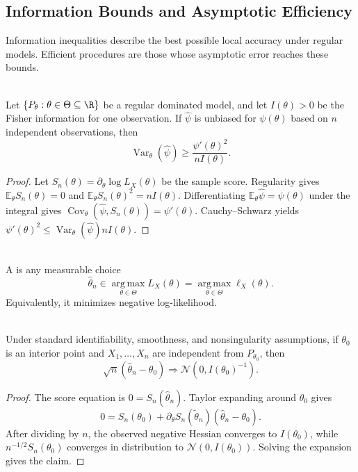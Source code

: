 \subsection{Information Bounds and Asymptotic Efficiency}

Information inequalities describe the best possible local accuracy under regular models.  Efficient procedures are those whose asymptotic error reaches these bounds.

\begin{theorem} \label{thm:cramer-rao-bound} \\
Let $\{P_\theta:\theta\in\Theta\subseteq\R\}$ be a regular dominated model, and let $I(\theta)>0$ be the Fisher information for one observation.  If $\widehat{\psi}$ is unbiased for $\psi(\theta)$ based on $n$ independent observations, then
\[
\operatorname{Var}_\theta(\widehat{\psi})
\geq \frac{\psi'(\theta)^2}{nI(\theta)}.
\]
\begin{proof}
Let $S_n(\theta)=\partial_\theta\log L_X(\theta)$ be the sample score.  Regularity gives $\mathbb{E}_\theta S_n(\theta)=0$ and $\mathbb{E}_\theta S_n(\theta)^2=nI(\theta)$.  Differentiating $\mathbb{E}_\theta\widehat{\psi}=\psi(\theta)$ under the integral gives $\operatorname{Cov}_\theta(\widehat{\psi},S_n(\theta))=\psi'(\theta)$.  Cauchy--Schwarz yields $\psi'(\theta)^2\leq \operatorname{Var}_\theta(\widehat{\psi})nI(\theta)$.
\end{proof}
\end{theorem}

\begin{definition} \label{def:maximum-likelihood-estimator} \\
A  is any measurable choice
\[
\widehat{\theta}_n\in\operatorname*{arg\,max}_{\theta\in\Theta}L_X(\theta)
=\operatorname*{arg\,max}_{\theta\in\Theta}\ell_X(\theta).
\]
Equivalently, it minimizes negative log-likelihood.
\end{definition}

\begin{theorem} \label{thm:mle-asymptotic-normality} \\
Under standard identifiability, smoothness, and nonsingularity assumptions, if $\theta_0$ is an interior point and $X_1,\ldots,X_n$ are independent from $P_{\theta_0}$, then
\[
\sqrt{n}(\widehat{\theta}_n-\theta_0)
\Rightarrow \mathcal{N}(0,I(\theta_0)^{-1}).
\]
\begin{proof}
The score equation is $0=S_n(\widehat{\theta}_n)$.  Taylor expanding around $\theta_0$ gives
\[
0=S_n(\theta_0)+\partial_\theta S_n(\widetilde{\theta}_n)(\widehat{\theta}_n-\theta_0).
\]
After dividing by $n$, the observed negative Hessian converges to $I(\theta_0)$, while $n^{-1/2}S_n(\theta_0)$ converges in distribution to $\mathcal{N}(0,I(\theta_0))$.  Solving the expansion gives the claim.
\end{proof}
\end{theorem}


